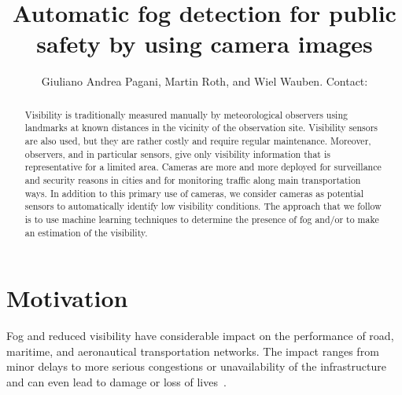 \documentclass{article}
\title{Automatic fog detection for public safety by using camera images}
\author{Giuliano Andrea Pagani\affil{1}, Martin Roth\affil{1}, and Wiel Wauben\affil{1}. Contact: \email{pagani@knmi.nl}}
\begin{document}
\maketitle

\begin{abstract}
Visibility is traditionally measured manually by meteorological observers using landmarks at known distances in
the vicinity of the observation site. 
Visibility sensors are also used, but they are rather costly and
require regular maintenance. Moreover, observers, and in particular sensors, give only visibility information that is
representative for a limited area. 
Cameras are more and more deployed for surveillance and security reasons in cities and for monitoring traffic along
main transportation ways. In addition to this primary use of cameras, we consider cameras as potential sensors to
automatically identify low visibility conditions. 
The approach that we follow is to use machine learning techniques
to determine the presence of fog and/or to make an estimation of the visibility. 
\end{abstract}

\bcols %

\section*{Motivation}
Fog and reduced visibility have considerable impact on the performance of road, maritime, and aeronautical transportation
networks. The impact ranges from minor delays to more serious congestions or unavailability of the
infrastructure and can even lead to damage or loss of lives~\cite{gultepe07}.
\end{document}
